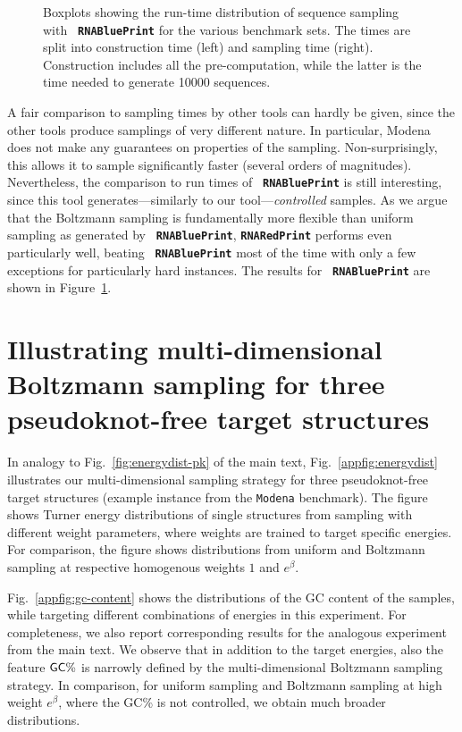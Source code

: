 \documentclass[10pt]{article}
\newcommand{\Nuc}[1]{{\sf #1}}
\newcommand{\Cb}{\Nuc{C}}
\newcommand{\Gb}{\Nuc{G}}
\newcommand{\GCb}{\Gb\Cb}
\newcommand{\RNAblueprint}{{\tt \bfseries{}\color{black!85} RNA\textcolor{blue!70!black}{Blue}Print}}
\newcommand{\ourprog}{{\tt \bfseries{}\color{black!85}RNA\textcolor{red!70!black}{Red}Print}}
\newenvironment{revision}{\color{red}}{\color{black}}
\begin{document}
\begin{revision}
\begin{figure}[h!]
  \caption{Boxplots showing the run-time distribution of sequence sampling with \RNAblueprint{} for the various benchmark sets. The times are split into construction time (left) and sampling time (right). Construction includes all the pre-computation, while the latter is the time needed to generate 10000 sequences.}
  \label{appfig:run-times-rbp}
\end{figure}

A fair comparison to sampling times by other tools can hardly be given, since the other tools produce samplings of very different nature. In particular, Modena does not make any guarantees on properties of the sampling. Non-surprisingly, this allows it to sample significantly faster (several orders of magnitudes).
Nevertheless, the comparison to run times of \RNAblueprint{} is still interesting, since this tool generates---similarly to our tool---\emph{controlled} samples. As we argue that the Boltzmann sampling is fundamentally more flexible than uniform sampling as generated by \RNAblueprint, \ourprog{} performs even particularly well, beating \RNAblueprint{} most of the time with only a few exceptions for particularly hard instances. The results for \RNAblueprint{} are shown in Figure~\ref{appfig:run-times-rbp}.

\end{revision}

\section{Illustrating multi-dimensional Boltzmann sampling for three pseudoknot-free target structures}
\label{appsec:illustrating-mdbs}

In analogy to Fig.~\ref{fig:energydist-pk} of the main text,
    Fig.~\ref{appfig:energydist} illustrates our multi-dimensional sampling
    strategy for three pseudoknot-free target structures (example instance
    from the \texttt{Modena} benchmark). The figure shows Turner energy
    distributions of single structures from sampling with different weight
    parameters, where weights are trained to target specific energies. For
    comparison, the figure shows distributions from uniform and Boltzmann
    sampling at respective homogenous weights $1$ and $e^\beta$.

    Fig.~\ref{appfig:gc-content} shows the distributions of the GC content of the samples, while targeting different combinations of energies in this experiment. For completeness, we also report corresponding results for the analogous experiment from the main text. We observe that in addition to the target energies, also the feature $\GCb\%$ is narrowly defined by the multi-dimensional Boltzmann sampling strategy. In comparison, for uniform sampling and Boltzmann sampling at high weight $e^\beta$, where the \GCb\% is not controlled, we obtain much broader distributions. 
\end{document}
